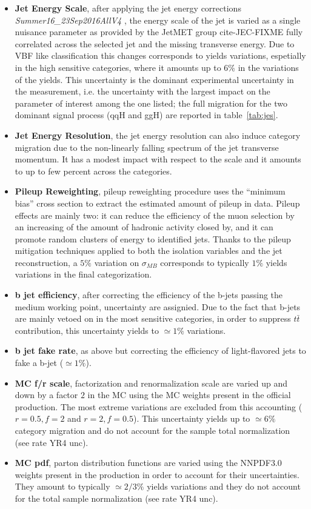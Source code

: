 \begin{itemize}
    \item {\bf Jet Energy Scale}, after applying the jet energy corrections {\it Summer16\_23Sep2016AllV4 }, the energy scale of the jet is varied as a single nuisance parameter as provided by the JetMET group cite-JEC-FIXME fully correlated across the selected jet and the missing transverse energy. Due to VBF like classification this changes corresponds to yields variations, espetially  in the high sensitive categories, where it amounts up to $6\%$ in the  variations of the yields. This uncertainty is the dominant experimental uncertainty in the measurement,
    i.e. the uncertainty with the largest impact on the parameter of interest among the one listed;
    the full migration for the two dominant signal process (qqH and ggH) are reported in table~\ref{tab:jes}.
    \item {\bf Jet Energy Resolution}, the jet energy resolution can also induce category migration due to the non-linearly falling spectrum of the jet transverse momentum. It has a modest impact with respect to the scale and it amounts to up to few percent across the categories.
    \item {\bf Pileup Reweighting}, pileup reweighting procedure uses the ``minimum bias'' cross section to extract the estimated amount of pileup in data.
    Pileup effects are mainly two: it can reduce the efficiency of the muon selection by an increasing of the amount of hadronic activity closed by, and it can promote random clusters of energy to identified jets. Thanks to the pileup mitigation techniques applied to both the isolation variables and the jet reconstruction, a $5\%$ variation on $\sigma_{MB}$  corresponds to typically $1\%$ yields variations in the final categorization.
    \item {\bf b jet efficiency}, after correcting the efficiency of the b-jets passing the medium working point, uncertainty are assignied. Due to the fact that b-jets are mainly vetoed on in the most sensitive categories, in order to suppress {$t\bar{t}$} contribution, this uncertainty yields to $\simeq 1\%$ variations.
    \item {\bf b jet fake rate},  as above but correcting the efficiency of light-flavored jets to fake a b-jet ($\simeq 1\%$).
    \item {\bf MC f/r scale}, factorization and renormalization scale are varied up and down by a factor $2$ in the MC using the MC weights present in the official production. The most extreme variations are excluded from this accounting ($r=0.5,f=2$ and $r=2,f=0.5$). This uncertainty yields up to $\simeq 6\%$ category migration and do not account for the sample total normalization (see rate YR4 unc).
    \item {\bf MC pdf}, parton distribution functions are varied using the NNPDF3.0 weights present in the production in order to account for their uncertainties. They amount to typically $\simeq 2/3\%$ yields variations and they do not account for the total sample normalization (see rate YR4 unc).
\end{itemize}

